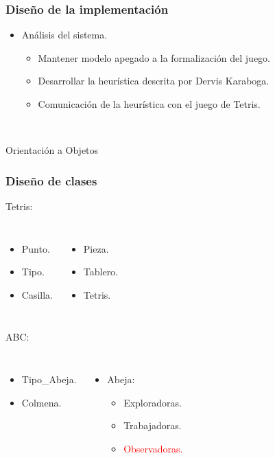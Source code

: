\begin{frame}
\frametitle{Diseño de la implementación}
\begin{itemize}
\pause
\item Análisis del sistema.
\pause
\begin{itemize}
\item Mantener modelo apegado a la formalización del juego.
\item Desarrollar la heurística descrita por Dervis Karaboga.
\item Comunicación de la heurística con el juego de Tetris.
\pause
\begin{figure}
\hbox{\hspace{4.5em} \scalebox{.55}{}}
\end{figure}
\end{itemize}
\end{itemize}
\pause
\begin{center}
Orientación a Objetos
\end{center}
\end{frame}


\begin{frame}
\frametitle{Diseño de clases}
\pause
\LARGE
Tetris:
\normalsize

\begin{columns}
\begin{itemize}
\item Punto.
\item Tipo.
\item Casilla.
\end{itemize}

\begin{itemize}
\item Pieza.
\item Tablero.
\item Tetris.
\end{itemize}
\end{columns}
\pause

\vspace{10mm}

\LARGE
ABC:
\normalsize
\pause
\begin{columns}
\begin{itemize}
\item Tipo\_Abeja.
\item Colmena.
\end{itemize}

\begin{itemize}
\item Abeja:
\pause
\begin{itemize}
\item Exploradoras.
\item Trabajadoras.
\item \textcolor<6->{red}{Observadoras.}
\end{itemize}
\end{itemize}
\end{columns}

\end{frame}



